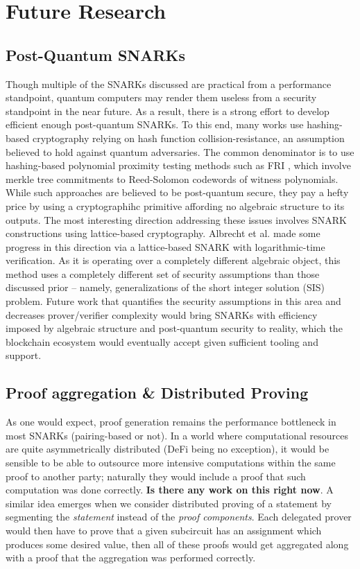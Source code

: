 \section{Future Research}

\subsection{Post-Quantum SNARKs}
\noindent Though multiple of the SNARKs discussed are practical from a performance standpoint, quantum computers may render them useless from a security standpoint in the near future. As a result, there is a strong effort to develop efficient enough post-quantum SNARKs. To this end, many works \cite{starks, ligero, fractal, spartan} use hashing-based cryptography relying on hash function collision-resistance, an assumption believed to hold against quantum adversaries. The common denominator is to use hashing-based polynomial proximity testing methods such as FRI \cite{FRI}, which involve merkle tree commitments to Reed-Solomon codewords of witness polynomials. While such approaches are believed to be post-quantum secure, they pay a hefty price by using a cryptographihc primitive affording no algebraic structure to its outputs. The most interesting direction addressing these issues involves SNARK constructions using lattice-based cryptography. Albrecht et al. \cite{lattice1} made some progress in this direction via a lattice-based SNARK with logarithmic-time verification. As it is operating over a completely different algebraic object, this method uses a completely different set of security assumptions than those discussed prior -- namely, generalizations of the short integer solution (SIS) problem. Future work that quantifies the security assumptions in this area and decreases prover/verifier complexity would bring SNARKs with efficiency imposed by algebraic structure and post-quantum security to reality, which the blockchain ecosystem would eventually accept given sufficient tooling and support.

\subsection{Proof aggregation \& Distributed Proving}
\noindent As one would expect, proof generation remains the performance bottleneck in most SNARKs (pairing-based or not). In a world where computational resources are quite asymmetrically distributed (DeFi being no exception), it would be sensible to be able to outsource more intensive computations within the same proof to another party; naturally they would include a proof that such computation was done correctly. \textbf{Is there any work on this right now}. A similar idea emerges when we consider distributed proving of a statement by segmenting the \textit{statement} instead of the \textit{proof components}. Each delegated prover would then have to prove that a given subcircuit has an assignment which produces some desired value, then all of these proofs would get aggregated along with a proof that the aggregation was performed correctly.\\

